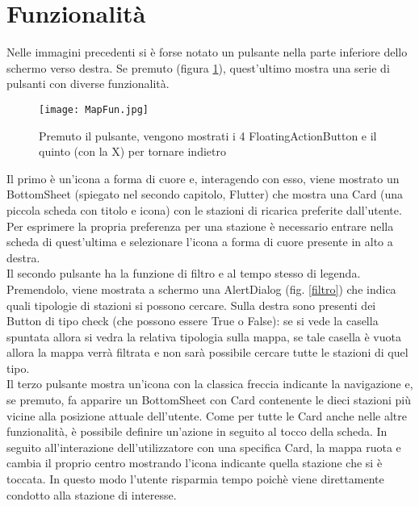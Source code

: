 \section{Funzionalità}
Nelle immagini precedenti si è forse notato un pulsante nella parte inferiore
dello schermo verso destra. Se premuto (figura \ref{4puls}), quest'ultimo mostra una serie di
pulsanti con diverse funzionalità. 
\begin{figure}[!h]
    \centering
    \texttt{[image: MapFun.jpg]}
    \caption{Premuto il pulsante, vengono mostrati i 4 FloatingActionButton e il quinto (con la X) per tornare indietro}
    \label{4puls}
\end{figure}
Il primo è un'icona a forma di cuore e,
interagendo con esso, viene mostrato un BottomSheet (spiegato nel secondo
capitolo, Flutter) che mostra una Card (una piccola scheda con titolo e icona)
con le stazioni di ricarica preferite dall'utente. Per esprimere la propria
preferenza per una stazione è necessario entrare nella scheda di quest'ultima e
selezionare l'icona a forma di cuore presente in alto a destra. \\
Il secondo pulsante ha la funzione di filtro e al tempo stesso di legenda.
Premendolo, viene mostrata a schermo una AlertDialog (fig. \ref{filtro}) che indica quali
tipologie di stazioni si possono cercare. Sulla destra sono presenti dei Button
di tipo check (che possono essere True o False): se si vede la casella spuntata
allora si vedra la relativa tipologia sulla mappa, se tale casella è vuota
allora la mappa verrà filtrata e non sarà possibile cercare tutte le stazioni di
quel tipo. \\
Il terzo pulsante mostra un'icona con la classica freccia indicante la
navigazione e, se premuto, fa apparire un BottomSheet con Card contenente le
dieci stazioni più vicine alla posizione attuale dell'utente. Come per tutte le
Card anche nelle altre funzionalità, è possibile definire un'azione in seguito
al tocco della scheda. In seguito all'interazione dell'utilizzatore con una
specifica Card, la mappa ruota e cambia il proprio centro mostrando l'icona
indicante quella stazione che si è toccata. In questo modo l'utente risparmia
tempo poichè viene direttamente condotto alla stazione di interesse.
